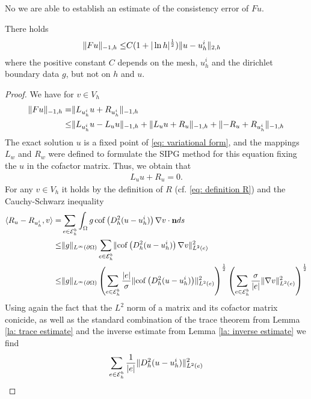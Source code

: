 No we are able to establish an estimate of the consistency error of $Fu$.
\begin{theorem} \label{la: consistency error F}
	There holds
	\begin{align*}
	\lVert Fu \rVert_{-1,h} \leq& C (1+|\ln h|^{\frac 1 2}) \lVert u-u_h^i \rVert_{2,h}
	\end{align*}
	where the positive constant $C$ depends on the mesh, $u^i_h$ and the dirichlet boundary data $g$, but not on $h$ and $u$. 
\end{theorem}
\begin{proof}
	We have for $v \in V_h$
	\begin{align}
	\lVert Fu \rVert_{-1,h} =& \lVert  L_{u^i_h}u + R_{u^i_h} \rVert_{-1,h} \nonumber\\
	\leq& \lVert  L_{u^i_h}u - L_u u \rVert_{-1,h} + \lVert  L_{u}u + R_u \rVert_{-1,h} + \lVert  -R_u + R_{u^i_h} \rVert_{-1,h} \label{eq: Fu first estimate}
	\end{align}	
	The exact solution $u$ is a fixed point of \eqref{eq: variational form}, and the mappings $L_w$ and $R_w$ were defined to formulate the SIPG method for this equation fixing the $u$ in the cofactor matrix. Thus, we obtain that 
	\begin{align}
	L_{u} u + R_u = 0. \label{eq: right solution L+U}
	\end{align}
	For any $v \in V_h$ it holds by the definition of $R$ (cf. \eqref{eq: definition R}) and the Cauchy-Schwarz inequality
	\begin{align}
	 \langle R_u - R_{u^i_h}, v \rangle 
	=& \sum_{e \in \mathcal{E}_h^b} \int_\Omega g \operatorname{cof} \left( D_h^2 (u-u_h^i) \right) \nabla v \cdot \mathbf n ds \nonumber \\
	\leq& \lVert g \rVert_{L^\infty(\partial \Omega)}
	\sum_{e \in \mathcal{E}_h^b} \lVert  \operatorname{cof} \left( D_h^2 (u-u_h^i) \right) \nabla v  \rVert_{L^2(e)}^2 \nonumber \\
	\leq& \lVert g \rVert_{L^\infty(\partial \Omega)}
	\left( \sum_{e \in \mathcal{E}_h^b} \frac {|e|} \sigma \lVert  \operatorname{cof} \left( D_h^2 (u-u_h^i) \right) \rVert_{L^2(e)}^2  \right)^{\frac 1 2}
	\left( \sum_{e \in \mathcal{E}_h^b} \frac \sigma {|e|} \lVert \nabla v  \rVert_{L^2(e)}^2  \right)^{\frac 1 2}	 \label{eq: R first estimate}
	\end{align}
	Using again the fact that the $L^2$ norm of a matrix and its cofactor matrix conicide, as well as the standard combination of the trace theorem from Lemma \ref{la: trace estimate} and the inverse estimate from Lemma \ref{la: inverse estimate} we find
	\begin{align}
	\sum_{e \in \edgesb} \frac 1 {|e|} \LTwonormE{ \hess{(u-u_h^i)}}^2 

\end{align}
\end{proof}
